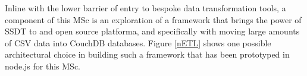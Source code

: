 \documentclass[parskip=full]{scrartcl}
\begin{document}
Inline with the lower barrier of entry to bespoke data transformation tools, a component of this MSc is an exploration of a framework that brings the power of SSDT to and open source platforma, and specifically with moving large amounts of CSV data into CouchDB databases. Figure \ref{nETL} shows one possible architectural choice in building such a framework that has been prototyped in node.js for this MSc.


\newpage


\end{document}
